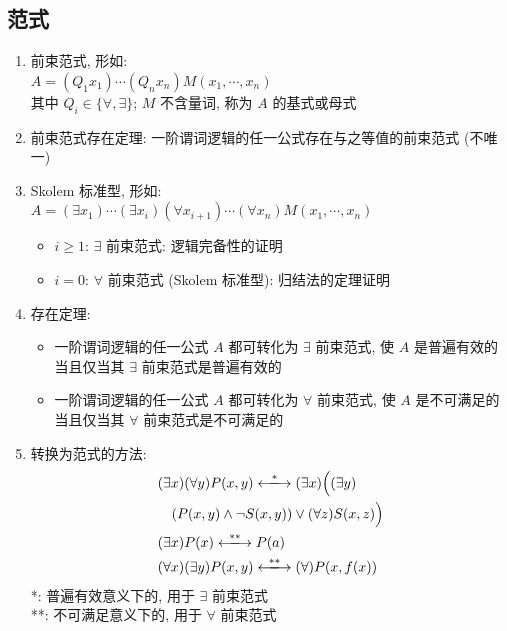 \documentclass[11pt,a4paper,twocolumn,fleqn]{article} %
\begin{document}
\subsection{范式} %
\label{sub:forming}
\begin{enumerate}
	\item 前束范式, 形如: \\
	$A = (Q_1 x_1)\cdots(Q_n x_n)M(x_1, \cdots, x_n)$\\
	其中 $Q_i\in\{\forall, \exists\}$; $M$ 不含量词, 称为 $A$ 的基式或母式
	\item 前束范式存在定理: 一阶谓词逻辑的任一公式存在与之等值的前束范式 (不唯一)
	\item Skolem 标准型, 形如: \\
	$A = (\exists x_1)\cdots(\exists x_i)(\forall x_{i+1})\cdots(\forall x_n)
	M(x_1,\cdots, x_n)$
	\begin{itemize}
		\item $i\ge 1$: $\exists$ 前束范式: 逻辑完备性的证明
		\item $i = 0$: $\forall$ 前束范式 (Skolem 标准型): 归结法的定理证明
	\end{itemize}
	\item 存在定理: 
	\begin{itemize}
		\item 一阶谓词逻辑的任一公式 $A$ 都可转化为 $\exists$ 前束范式, 
		使 $A$ 是普遍有效的当且仅当其 $\exists$ 前束范式是普遍有效的
		\item 一阶谓词逻辑的任一公式 $A$ 都可转化为 $\forall$ 前束范式, 
		使 $A$ 是不可满足的当且仅当其 $\forall$ 前束范式是不可满足的
	\end{itemize}
	\item 转换为范式的方法: 
	\begin{align*}
		&  (\exists x)(\forall y) P(x, y)\xlongleftrightarrow{*}
		(\exists x)\Big((\exists y)\\
		& \quad (P(x, y)\land \lnot S(x, y) )\lor(\forall z)S(x, z)\Big) \\
		& (\exists x) P(x) \xlongleftrightarrow{**} P(a) \\
		& (\forall x)(\exists y) P(x, y) \xlongleftrightarrow{**} 
		(\forall)P(x, f(x)) 
	\end{align*}
	*: 普遍有效意义下的, 用于 $\exists$ 前束范式\\
	**: 不可满足意义下的, 用于 $\forall$ 前束范式
\end{enumerate}
\end{document}
